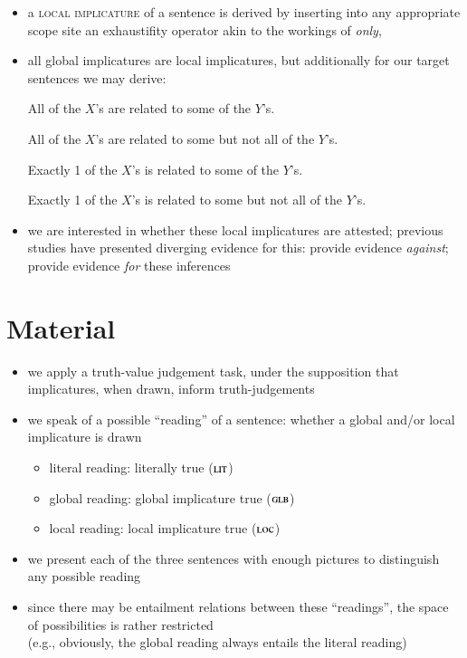 \documentclass[fleqn,reqno,10pt,draft]{article}
\newcommand{\lit}{\ensuremath{\text{\textsc{lit}}}}
\newcommand{\glb}{\ensuremath{\text{\textsc{glb}}}}
\newcommand{\loc}{\ensuremath{\text{\textsc{loc}}}}
\begin{document}
\begin{itemize}
\item a \textsc{local implicature} of a sentence is derived by
  inserting into any appropriate scope site an exhaustifity operator
  akin to the workings of \emph{only},
\item all global implicatures are local implicatures, but additionally
  for our target sentences we may derive:
  \begin{exe}
    \ex \label{bsp:All-some-local} All of the $X$'s are related to some of the $Y$'s.
      \begin{xlist}
      \ex All of the $X$'s are related to some but not all of the $Y$'s.
      \end{xlist}
    \ex \label{bsp:Exactly-1-some-local} Exactly 1 of the $X$'s is related to some of the $Y$'s.
      \begin{xlist}
      \ex Exactly 1 of the $X$'s is related to some but not all of the $Y$'s.
      \end{xlist}
  \end{exe}
\item we are interested in whether these local implicatures are
  attested; previous studies have presented diverging evidence for
  this: \citet{GeurtsPouscoulous2009:Embedded-Implic} provide evidence
  \emph{against}; \citet{ChemlaSpector2010:Experimental-Ev} provide evidence
  \emph{for} these inferences
\end{itemize}

\section{Material}
\label{sec:material}

\begin{itemize}
\item we apply a truth-value judgement task, under the supposition
  that implicatures, when drawn, inform truth-judgements
\item we speak of a possible ``reading'' of a sentence: whether a
  global and/or local implicature is drawn
  \begin{itemize}
  \item literal reading: literally true \hfill (\lit)
  \item global reading: global implicature true \hfill (\glb)
  \item local reading: local implicature true \hfill (\loc)
  \end{itemize}
\item we present each of the three sentences with enough pictures to
  distinguish any possible reading
\item since there may be entailment relations between these
  ``readings'', the space of possibilities is rather restricted\\
  (e.g., obviously, the global reading always entails the literal reading)
\end{itemize}
\end{document}
